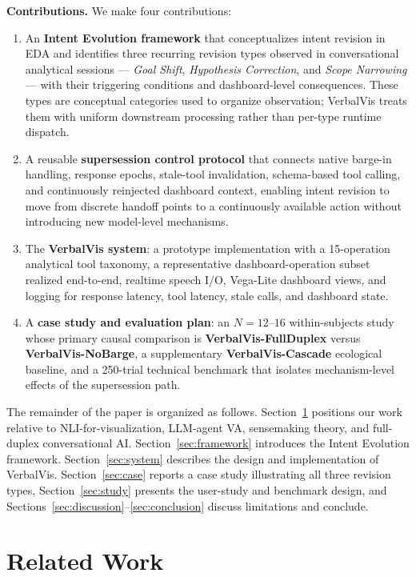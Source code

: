 \documentclass[journal]{IEEEtran}
\begin{document}
\textbf{Contributions.} We make four contributions:
\begin{enumerate}
\item An \textbf{Intent Evolution framework} that conceptualizes intent revision in EDA and identifies three recurring revision types observed in conversational analytical sessions --- \emph{Goal Shift}, \emph{Hypothesis Correction}, and \emph{Scope Narrowing} --- with their triggering conditions and dashboard-level consequences. These types are conceptual categories used to organize observation; VerbalVis treats them with uniform downstream processing rather than per-type runtime dispatch.
\item A reusable \textbf{supersession control protocol} that connects native barge-in handling, response epochs, stale-tool invalidation, schema-based tool calling, and continuously reinjected dashboard context, enabling intent revision to move from discrete handoff points to a continuously available action without introducing new model-level mechanisms.
\item The \textbf{VerbalVis system}: a prototype implementation with a 15-operation analytical tool taxonomy, a representative dashboard-operation subset realized end-to-end, realtime speech I/O, Vega-Lite dashboard views, and logging for response latency, tool latency, stale calls, and dashboard state.
\item A \textbf{case study and evaluation plan}: an $N{=}12$--$16$ within-subjects study whose primary causal comparison is \textbf{VerbalVis-FullDuplex} versus \textbf{VerbalVis-NoBarge}, a supplementary \textbf{VerbalVis-Cascade} ecological baseline, and a 250-trial technical benchmark that isolates mechanism-level effects of the supersession path.
\end{enumerate}

The remainder of the paper is organized as follows. Section~\ref{sec:related} positions our work relative to NLI-for-visualization, LLM-agent VA, sensemaking theory, and full-duplex conversational AI. Section~\ref{sec:framework} introduces the Intent Evolution framework. Section~\ref{sec:system} describes the design and implementation of VerbalVis. Section~\ref{sec:case} reports a case study illustrating all three revision types, Section~\ref{sec:study} presents the user-study and benchmark design, and Sections~\ref{sec:discussion}--\ref{sec:conclusion} discuss limitations and conclude.

\section{Related Work}
\label{sec:related}
\end{document}
